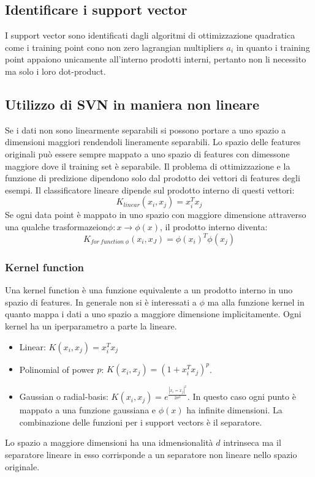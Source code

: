 	\subsection{Identificare i support vector}
	I support vector sono identificati dagli algoritmi di ottimizzazione quadratica come i training point cono non zero lagrangian multipliers $a_i$ in quanto i training point appaiono unicamente all'interno prodotti interni, pertanto non li necessito ma solo i loro dot-product.

	\subsection{Utilizzo di SVN in maniera non lineare}
	Se i dati non sono linearmente separabili si possono portare a uno spazio a dimensioni maggiori rendendoli lineramente separabili.
	Lo spazio delle features originali pu\`o essere sempre mappato a uno spazio di features con dimessone maggiore dove il training set \`e separabile.
	Il problema di ottimizzazione e la funzione di predizione dipendono solo dal prodotto dei vettori di features degli esempi.
	Il classificatore lineare dipende sul prodotto interno di questi vettori:
	$$K_{linear}(x_i,x_j) = x_i^Tx_j$$
	Se ogni data point \`e mappato in uno spazio con maggiore dimensione attraverso una qualche trasformazeion$\phi:x\rightarrow\phi(x)$, il prodotto interno diventa:
	$$K_{for\ function\ \phi}(x_i,x_J)= \phi(x_i)^T\phi(x_j)$$

		\subsubsection{Kernel function}
		Una kernel function \`e una funzione equivalente a un prodotto interno in uno spazio di features.
		In generale non si \`e interessati a $\phi$ ma alla funzione kernel in quanto mappa i dati a uno spazio a maggiore dimensione implicitamente.
		Ogni kernel ha un iperparametro a parte la lineare.
		\begin{itemize}
			\item Linear: $K(x_i,x_j) = x_i^Tx_j$
			\item Polinomial of power $p$: $K(x_i, x_j) = (1+x_i^Tx_j)^p$.
			\item Gaussian o radial-basis: $K(x_i, x_j) = e^{\frac{|x_i = x_j|^2}{2\sigma^2}}$.
				In questo caso ogni punto \`e mappato a una funzione gaussiana e $\phi(x)$ ha infinite dimensioni.
				La combinazione delle funzioni per i support vectors \`e il separatore.
		\end{itemize}
		Lo spazio a maggiore dimensioni ha una idmensionalit\`a $d$ intrinseca ma il separatore lineare in esso corrisponde a un separatore non lineare nello spazio originale.

